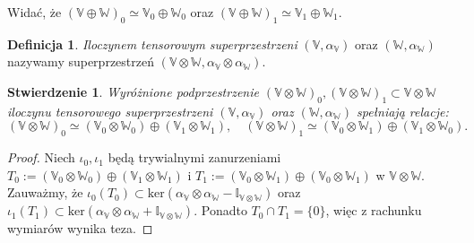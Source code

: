 \documentclass[11pt,a4paper]{report}
\newtheorem{proposition}[theorem]{Stwierdzenie}
\theoremstyle{definition}
\newtheorem{definition}[theorem]{Definicja}
\newcommand{\I}{\mathbb{I}}
\begin{document}
Widać, że $(\mathbb{V} \oplus \mathbb{W})_0 \simeq \mathbb{V}_0 \oplus \mathbb{W}_0$ oraz $(\mathbb{V} \oplus \mathbb{W})_1 \simeq \mathbb{V}_1 \oplus \mathbb{W}_1.$

\begin{definition}
	\textit{Iloczynem tensorowym superprzestrzeni} $(\mathbb{V},\alpha_\mathbb{V})$ oraz $(\mathbb{W},\alpha_\mathbb{W})$ nazywamy superprzestrzeń $(\mathbb{V} \otimes \mathbb{W}, \alpha_\mathbb{V} \otimes \alpha_\mathbb{W}).$
\end{definition}

\begin{proposition}
	\label{tensor_product_superspace_proposition}
	Wyróżnione podprzestrzenie $(\mathbb{V} \otimes \mathbb{W})_0,(\mathbb{V} \otimes \mathbb{W})_1 \subset \mathbb{V} \otimes \mathbb{W}$ iloczynu tensorowego superprzestrzeni $(\mathbb{V},\alpha_\mathbb{V})$ oraz $(\mathbb{W},\alpha_\mathbb{W})$ spełniają relacje:
	\begin{equation*}
		(\mathbb{V} \otimes \mathbb{W})_0 \simeq (\mathbb{V}_0 \otimes \mathbb{W}_0) \oplus (\mathbb{V}_1 \otimes \mathbb{W}_1), \quad (\mathbb{V} \otimes \mathbb{W})_1 \simeq (\mathbb{V}_0 \otimes \mathbb{W}_1) \oplus (\mathbb{V}_1 \otimes \mathbb{W}_0).
	\end{equation*}
\end{proposition}

\begin{proof}
	Niech $\iota_0, \iota_1$ będą trywialnymi zanurzeniami $T_0 := (\mathbb{V}_0 \otimes \mathbb{W}_0) \oplus (\mathbb{V}_1 \otimes \mathbb{W}_1)$ i $T_1 := (\mathbb{V}_0 \otimes \mathbb{W}_1) \oplus (\mathbb{V}_0 \otimes \mathbb{W}_1)$ w $\mathbb{V} \otimes \mathbb{W}$. Zauważmy, że $\iota_0 (T_0) \subset \mathrm{ker}(\alpha_\mathbb{V} \otimes \alpha_\mathbb{W} - \I_{\mathbb{V}\otimes \mathbb{W}})$ oraz $\iota_1 (T_1) \subset \mathrm{ker}(\alpha_\mathbb{V} \otimes \alpha_\mathbb{W} + \I_{\mathbb{V}\otimes \mathbb{W}}).$ Ponadto $T_0 \cap T_1 = \{ 0 \}$, więc z rachunku wymiarów wynika teza.
\end{proof}
\end{document}
